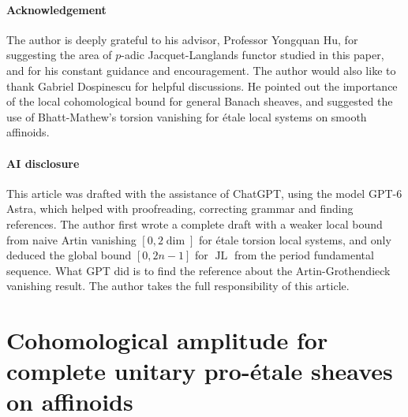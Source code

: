 \documentclass[11pt]{article}
\theoremstyle{definition}
\newcommand{\JL}{\operatorname{JL}}
\begin{document}
\paragraph{Acknowledgement}The author is deeply grateful to his advisor, Professor Yongquan Hu, for suggesting the area of $p$-adic Jacquet-Langlands functor studied in this paper, 
and for his constant guidance and encouragement. %
The author would also like to thank Gabriel Dospinescu for helpful discussions. 
He pointed out the importance of the local cohomological bound for general Banach sheaves, 
and suggested the use of Bhatt-Mathew's torsion vanishing for \'etale local systems on smooth affinoids. 

\paragraph{AI disclosure}This article was drafted with the assistance of ChatGPT, using the model GPT-6 Astra, which helped with proofreading, correcting grammar and finding references.  
The author first wrote a complete draft with a weaker local bound from naive Artin vanishing $[0, 2\dim]$ for \'etale torsion local systems, 
and only deduced the global bound $[0,2n-1]$ for $\JL$ from the period fundamental sequence. What GPT did is to find the reference \cite{GabberZavyalov} about the Artin-Grothendieck vanishing result.
The author takes the full responsibility of this article. 

\section{Cohomological amplitude for complete unitary pro-\'etale sheaves on affinoids}
\label{sec:general-local-amplitude}
\end{document}
